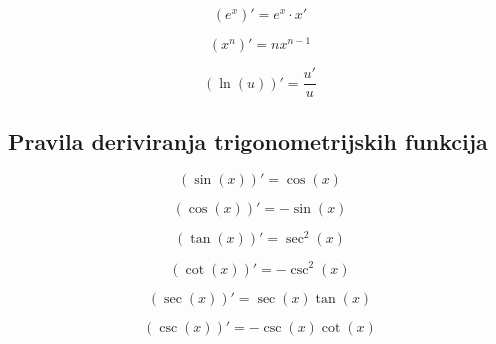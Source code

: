 \begin{proposition}
    $$
        (e^x)' = e^x \cdot x'
    $$
\end{proposition}

\begin{proposition}
    $$
        (x^{n})' = nx^{n-1}
    $$
\end{proposition}

\begin{proposition}
    $$
        (\ln(u))' = \frac{u'}{u}
    $$
\end{proposition}

\subsection{Pravila deriviranja trigonometrijskih funkcija}

\begin{proposition}
    $$
        (\sin(x))' = \cos(x)
    $$
\end{proposition}

\begin{proposition}
    $$
        (\cos(x))' = -\sin(x)
    $$
\end{proposition}

\begin{proposition}
    $$
        (\tan(x))' = \sec^2(x)
    $$
\end{proposition}

\begin{proposition}
    $$
        (\cot(x))' = -\csc^2(x)
    $$
\end{proposition}

\begin{proposition}
    $$
        (\sec(x))' = \sec(x) \tan(x)
    $$
\end{proposition}

\begin{proposition}
    $$
        (\csc(x))' = -\csc(x) \cot(x)
    $$
\end{proposition}
